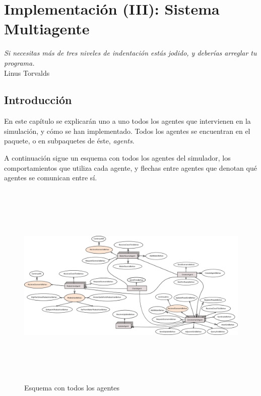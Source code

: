 \chapter{Implementación (III): Sistema Multiagente} \label{cap5c}

\begin{flushright}
\begin{minipage}{7.85cm}
    {\em Si necesitas más de tres niveles de indentación estás jodido, y
    deberías arreglar tu programa.} \\  Linus Torvalds
\end{minipage}
\end{flushright}

\vspace*{5mm}

\section{Introducción}

En este capítulo se explicarán uno a uno todos los agentes que intervienen en la
simulación, y cómo se han implementado. Todos los agentes se encuentran en el
paquete, o en subpaquetes de éste, {\em agents}.

A continuación sigue un esquema con todos los agentes del simulador, los
comportamientos que utiliza cada agente, y flechas entre agentes que denotan
qué agentes se comunican entre sí.

\begin{figure}[H]
 \centering
 \includegraphics[height=100mm,angle=90]{figuras/cap5/agents.png}
 \caption{Esquema con todos los agentes}
\end{figure}

